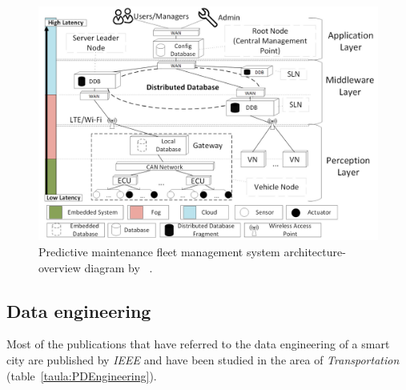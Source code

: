 \documentclass[a4paper,12pt,twoside]{ThesisStyle}
\begin{document}
\begin{figure}[hbt]
\centering
\includegraphics[width=13 cm]{imatges/killenArchitecture.png}
\caption{\label{fig:killenArchitecture} Predictive maintenance fleet management system architecture-overview diagram by ~\cite{killeen2019iot}.}
\end{figure}

\subsection{Data engineering}
\label{section:dataengineering}

Most of the publications that have referred to the data engineering of a smart city are published by \textit{IEEE} and have been studied in the area of \textit{Transportation} (table~\ref{taula:PDEngineering}). 
\end{document}
